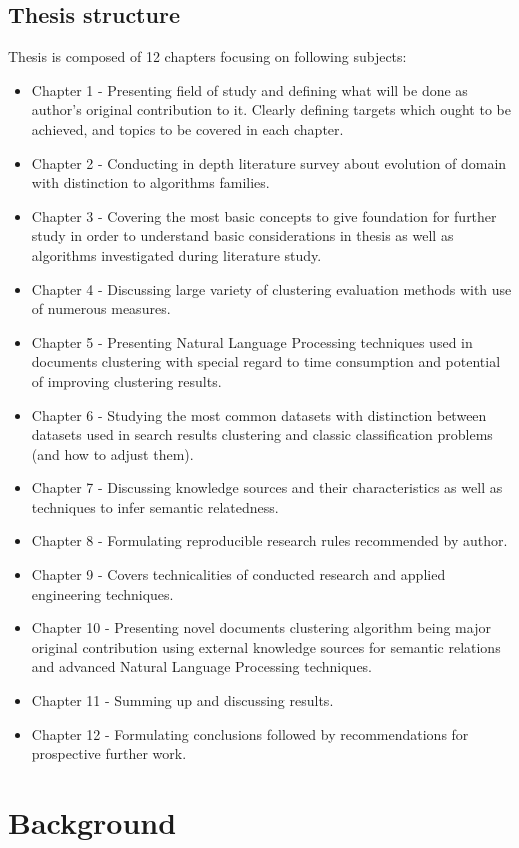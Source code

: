 \documentclass[a4paper, 12pt, oneside]{Thesis} %
\begin{document}
\section{Thesis structure} Thesis is composed of 12 chapters focusing on following subjects:
\begin{itemize}
 \item Chapter 1 - Presenting field of study and defining what will be done as author's original contribution to it. Clearly defining targets which ought to be achieved, and topics to be covered in each chapter.
 \item Chapter 2 - Conducting in depth literature survey about evolution of domain with distinction to algorithms families.
 \item Chapter 3 - Covering the most basic concepts to give foundation for further study in order to understand basic considerations in thesis as well as algorithms investigated during literature study.
 \item Chapter 4 - Discussing large variety of clustering evaluation methods with use of numerous measures.
 \item Chapter 5 - Presenting Natural Language Processing techniques used in documents clustering with special regard to time consumption and potential of improving clustering results.
 \item Chapter 6 - Studying the most common datasets with distinction between datasets used in search results clustering and classic classification problems (and how to adjust them).
 \item Chapter 7 - Discussing knowledge sources and their characteristics as well as techniques to infer semantic relatedness.
 \item Chapter 8 - Formulating reproducible research rules recommended by author.
 \item Chapter 9 - Covers technicalities of conducted research and applied engineering techniques.
 \item Chapter 10 - Presenting novel documents clustering algorithm being major original contribution using external knowledge sources for semantic relations and advanced Natural Language Processing techniques.
 \item Chapter 11 - Summing up and discussing results.
 \item Chapter 12 - Formulating conclusions followed by recommendations for prospective further work.
\end{itemize}

\chapter{Background}
\end{document}
